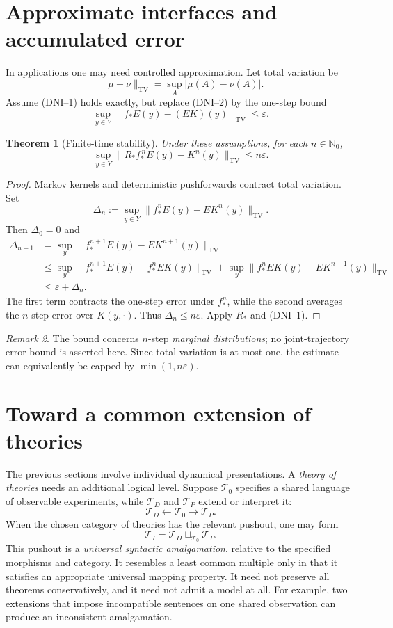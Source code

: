 \documentclass[11pt,letterpaper]{article}
\newtheorem{theorem}{Theorem}[section]
\theoremstyle{definition}
\theoremstyle{remark}
\newtheorem{remark}[theorem]{Remark}
\newcommand{\TT}{\mathcal T}
\newcommand{\TV}{\mathrm{TV}}
\newcommand{\NN}{\mathbb N}
\begin{document}
\section{Approximate interfaces and accumulated error}
In applications one may need controlled approximation. Let total variation be
\[
\|\mu-\nu\|_{\TV}=\sup_{A}|\mu(A)-\nu(A)|.
\]
Assume (DNI--1) holds exactly, but replace (DNI--2) by the one-step bound
\begin{equation}\label{eq:approx}
\sup_{y\in Y}\bigl\|f_*E(y)-(EK)(y)\bigr\|_{\TV}\le\varepsilon.
\end{equation}
\begin{theorem}[Finite-time stability]\label{thm:stability}
Under these assumptions, for each $n\in\NN_0$,
\[
\boxed{\sup_{y\in Y}\bigl\|R_*f_*^{\,n}E(y)-K^n(y)\bigr\|_{\TV}\le n\varepsilon.}
\]
\end{theorem}
\begin{proof}
Markov kernels and deterministic pushforwards contract total variation. Set
\[\Delta_n:=\sup_{y\in Y}\|f_*^nE(y)-EK^n(y)\|_{\TV}.\]
Then $\Delta_0=0$ and
\begin{align*}
\Delta_{n+1}
&=\sup_y\bigl\|f_*^{n+1}E(y)-EK^{n+1}(y)\bigr\|_{\TV}\\
&\le \sup_y\bigl\|f_*^{n+1}E(y)-f_*^nEK(y)\bigr\|_{\TV}
 +\sup_y\bigl\|f_*^nEK(y)-EK^{n+1}(y)\bigr\|_{\TV}\\
&\le\varepsilon+\Delta_n.
\end{align*}
The first term contracts the one-step error under $f_*^n$, while the second averages the $n$-step error over $K(y,\cdot)$. Thus $\Delta_n\le n\varepsilon$. Apply $R_*$ and (DNI--1).
\end{proof}
\begin{remark}
The bound concerns $n$-step \emph{marginal distributions}; no joint-trajectory error bound is asserted here. Since total variation is at most one, the estimate can equivalently be capped by $\min(1,n\varepsilon)$.
\end{remark}

\section{Toward a common extension of theories}
The previous sections involve individual dynamical presentations. A \emph{theory of theories} needs an additional logical level. Suppose $\TT_0$ specifies a shared language of observable experiments, while $\TT_D$ and $\TT_P$ extend or interpret it:
\[
\TT_D\longleftarrow\TT_0\longrightarrow\TT_P.
\]
When the chosen category of theories has the relevant pushout, one may form
\begin{equation}\label{eq:pushout}
\boxed{\TT_I=\TT_D\sqcup_{\TT_0}\TT_P.}
\end{equation}
This pushout is a \emph{universal syntactic amalgamation}, relative to the specified morphisms and category. It resembles a least common multiple only in that it satisfies an appropriate universal mapping property. It need not preserve all theorems conservatively, and it need not admit a model at all. For example, two extensions that impose incompatible sentences on one shared observation can produce an inconsistent amalgamation.
\end{document}
